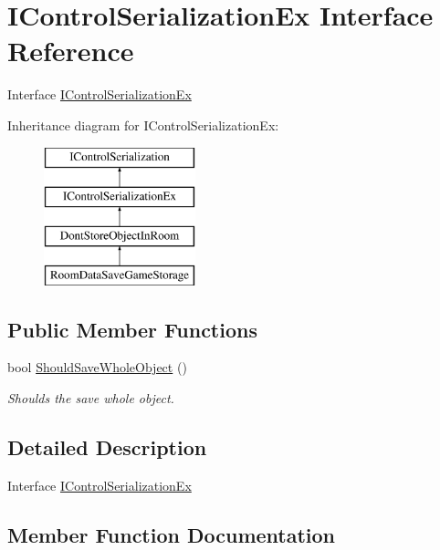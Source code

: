 \hypertarget{interface_i_control_serialization_ex}{}\section{I\+Control\+Serialization\+Ex Interface Reference}
\label{interface_i_control_serialization_ex}


Interface \hyperlink{interface_i_control_serialization_ex}{I\+Control\+Serialization\+Ex}  


Inheritance diagram for I\+Control\+Serialization\+Ex\+:\begin{figure}[H]
\begin{center}
\leavevmode
\includegraphics[height=4.000000cm]{interface_i_control_serialization_ex}
\end{center}
\end{figure}
\subsection*{Public Member Functions}
\begin{DoxyCompactItemize}
\item 
bool \hyperlink{interface_i_control_serialization_ex_a7632c9b446f991de87cfd0f4a69bfeb7}{Should\+Save\+Whole\+Object} ()
\begin{DoxyCompactList}\small\item\em Shoulds the save whole object. \end{DoxyCompactList}\end{DoxyCompactItemize}


\subsection{Detailed Description}
Interface \hyperlink{interface_i_control_serialization_ex}{I\+Control\+Serialization\+Ex} 



\subsection{Member Function Documentation}
\mbox{\label{interface_i_control_serialization_ex_a7632c9b446f991de87cfd0f4a69bfeb7}} 
